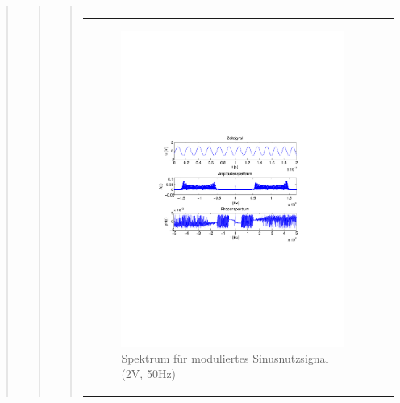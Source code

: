 \begin{quote}
\begin{quote}
\begin{quote}
\begin{center}
\begin{tabular}{ll}
            \end{tabular}
            \end{center}
        
        
               \begin{center}
            \begin{tabular}{ll}

            \hspace{-10em}
                \begin{minipage}{0.6\textwidth}

                    \begin{figure}[H]
                        \label{fig:}
                        \includegraphics[scale=0.5, trim = 4cm 9.5cm 3.5cm
                        9.5cm, clip]{./Bilder/sin_a2_f50}
                        \caption{Spektrum für moduliertes Sinusnutzsignal (2V,
                        50Hz)}
                    \end{figure}


\end{minipage}
\end{tabular}
\end{center}
\end{quote}
\end{quote}
\end{quote}
